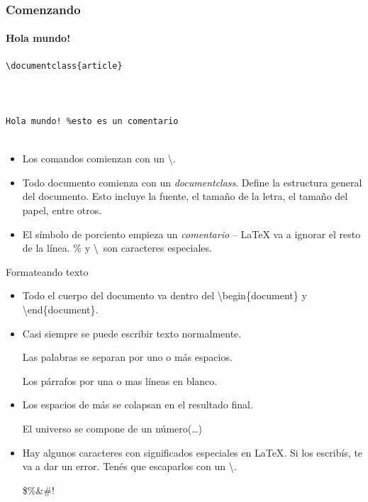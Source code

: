 \begin{frame}[fragile]
\frametitle{Comenzando}
\framesubtitle{Hola mundo!}

\begin{multicols}{2}
\begin{lstlisting}[title={hola\_mundo.tex}]
\documentclass{article}



Hola mundo! %esto es un comentario


\end{lstlisting}
\vspace*{\fill}
\columnbreak

\begin{itemize}
    \item Los comandos comienzan con un \textbackslash.
    \item Todo documento comienza con un \textit{documentclass}. Define la estructura general del documento. Esto incluye la fuente, el tamaño de la letra, el tamaño del papel, entre otros.    
    \item El símbolo de porciento empieza un \emph{comentario} -- \LaTeX{} va a ignorar el resto de la línea. \% y \textbackslash\ son caracteres especiales.
\end{itemize}

\end{multicols}
\end{frame}

\begin{frame}[fragile]{Formateando texto}
    \small
    \begin{itemize}
    \item Todo el cuerpo del documento va dentro del \textbackslash begin\{document\} y \textbackslash end\{document\}.
    \item Casi siempre se puede escribir texto normalmente.
    \begin{exampletwouptiny}
    Las palabras se separan 
    por uno o más espacios.

    Los párrafos por una o 
    mas líneas en blanco.
    \end{exampletwouptiny}
    \item Los espacios de más se colapsan en el resultado final.
    \begin{exampletwouptiny}

    El     universo    se compone 
    de un           número(\ldots)
        
    \end{exampletwouptiny}
    \item Hay algunos caracteres con significados especiales en \LaTeX{}. Si los escribís, te va a dar un error. Tenés que escaparlos con un \textbackslash.
    \begin{exampletwoup}
        \$\%\&\#!
        \end{exampletwoup}
    \end{itemize}
\end{frame}


